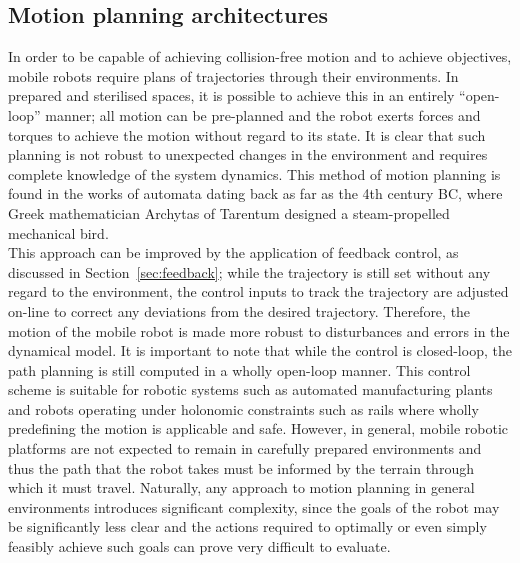 \subsection{Motion planning architectures}
In order to be capable of achieving collision-free motion and to achieve objectives, mobile robots require plans of trajectories through their environments. In prepared and sterilised spaces, it is possible to achieve this in an entirely ``open-loop'' manner; all motion can be pre-planned and the robot exerts forces and torques to achieve the motion without regard to its state. It is clear that such planning is not robust to unexpected changes in the environment and requires complete knowledge of the system dynamics. This method of motion planning is found in the works of automata dating back as far as the 4th century BC, where Greek mathematician Archytas of Tarentum designed a steam-propelled mechanical bird. \\

This approach can be improved by the application of feedback control, as discussed in Section~\ref{sec:feedback}; while the trajectory is still set without any regard to the environment, the control inputs to track the trajectory are adjusted on-line to correct any deviations from the desired trajectory. Therefore, the motion of the mobile robot is made more robust to disturbances and errors in the dynamical model. It is important to note that while the control is closed-loop, the path planning is still computed in a wholly open-loop manner. This control scheme is suitable for robotic systems such as automated manufacturing plants and robots operating under holonomic constraints such as rails where wholly predefining the motion is applicable and safe. However, in general, mobile robotic platforms are not expected to remain in carefully prepared environments and thus the path that the robot takes must be informed by the terrain through which it must travel. Naturally, any approach to motion planning in general environments introduces significant complexity, since the goals of the robot may be significantly less clear and the actions required to optimally or even simply feasibly achieve such goals can prove very difficult to evaluate.\\

